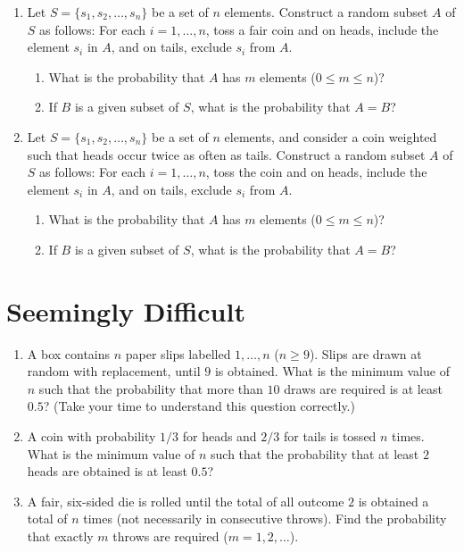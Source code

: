 \documentclass[svgnames]{amsart}
\begin{document}
\begin{enumerate}[leftmargin=*]
\item Let $S = \{s_1, s_2, \ldots, s_n\}$ be a set of $n$ elements. Construct a random subset $A$ of $S$ as follows: For each $i = 1, \ldots, n$, toss a fair coin and on heads, include the element $s_i$ in $A$, and on tails, exclude $s_i$ from $A$.
\begin{enumerate}
	\item What is the probability that $A$ has $m$ elements ($0 \le m \le n$)?
	\item If $B$ is a given subset of $S$, what is the probability that $A = B$?
\end{enumerate}

\item Let $S = \{s_1, s_2, \ldots, s_n\}$ be a set of $n$ elements, and consider a coin weighted such that heads occur twice as often as tails. Construct a random subset $A$ of $S$ as follows: For each $i = 1, \ldots, n$, toss the coin and on heads, include the element $s_i$ in $A$, and on tails, exclude $s_i$ from $A$.
\begin{enumerate}
	\item What is the probability that $A$ has $m$ elements ($0 \le m \le n$)?
	\item If $B$ is a given subset of $S$, what is the probability that $A = B$?
\end{enumerate}

\end{enumerate} %

\section{Seemingly Difficult}
\begin{enumerate}[leftmargin=*]
\item A box contains $n$ paper slips labelled $1, \ldots, n$ ($n \ge 9$). Slips are drawn at random with replacement, until $9$ is obtained. What is the minimum value of $n$ such that the probability that more than $10$ draws are required is at least $0.5$? {\scriptsize (Take your time to understand this question correctly.)}

\item A coin with probability $1/3$ for heads and $2/3$ for tails is tossed $n$ times. What is the minimum value of $n$ such that the probability that at least $2$ heads are obtained is at least $0.5$?

\item A fair, six-sided die is rolled until the total of all outcome $2$ is obtained a total of $n$ times (not necessarily in consecutive throws). Find the probability that exactly $m$ throws are required ($m = 1, 2, \ldots$).
\end{enumerate} %
\end{document}

